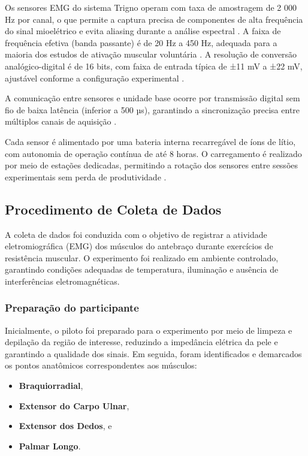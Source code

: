 \documentclass[symbols]{fei}
\begin{document}
Os sensores EMG do sistema Trigno operam com taxa de amostragem de 2 000 Hz por canal, o que permite a captura precisa de 
componentes de alta frequência do sinal mioelétrico e evita aliasing durante a análise espectral \cite{trigno_specs, trigno_userguide}. 
A faixa de frequência efetiva (banda passante) é de 20 Hz a 450 Hz, adequada para a maioria dos estudos de ativação muscular 
voluntária \cite{trigno_manual}. A resolução de conversão analógico-digital é de 16 bits, com faixa de entrada 
típica de ±11 mV a ±22 mV, ajustável conforme a configuração experimental \cite{trigno_personal_manual}.

A comunicação entre sensores e unidade base ocorre por transmissão digital sem fio de baixa latência (inferior a 500 µs), 
garantindo a sincronização precisa entre múltiplos canais de aquisição \cite{trigno_specs}.

Cada sensor é alimentado por uma bateria interna recarregável de íons de lítio, com autonomia de operação contínua de até 8 horas. 
O carregamento é realizado por meio de estações dedicadas, permitindo a rotação dos sensores entre sessões experimentais sem perda de 
produtividade \cite{trigno_specs}.

\subsection{Procedimento de Coleta de Dados}

A coleta de dados foi conduzida com o objetivo de registrar a atividade eletromiográfica (EMG) dos músculos do antebraço durante 
exercícios de resistência muscular. O experimento foi realizado em ambiente controlado, garantindo condições adequadas de temperatura, 
iluminação e ausência de interferências eletromagnéticas.

\subsubsection{Preparação do participante}

Inicialmente, o piloto foi preparado para o experimento por meio de limpeza e depilação da região de interesse, reduzindo a impedância 
elétrica da pele e garantindo a qualidade dos sinais. Em seguida, foram identificados e demarcados os pontos anatômicos correspondentes 
aos músculos:
\begin{itemize}
    \item \textbf{Braquiorradial},
    \item \textbf{Extensor do Carpo Ulnar},
    \item \textbf{Extensor dos Dedos}, e
    \item \textbf{Palmar Longo}.
\end{itemize}
\end{document}
